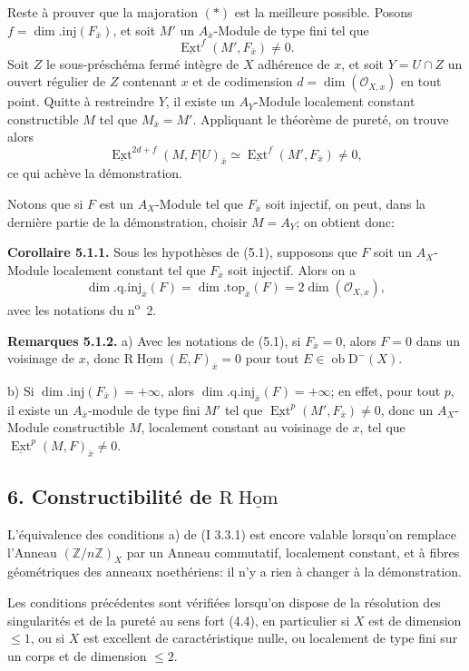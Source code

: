 \documentclass[11pt]{article}
\DeclareMathOperator{\Hom}{Hom}
\DeclareMathOperator{\Ext}{Ext}
\newcommand{\R}{\mathrm{R}}\newcommand{\RHomCore}{\mathrm{RHom}}
\newcommand{\D}{\mathrm{D}}
\newcommand{\Z}{\mathbb{Z}}
\newcommand{\ob}{\operatorname{ob}}
\providecommand{\Hom}{\operatorname{Hom}}
\providecommand{\ob}{\operatorname{ob}}
\providecommand{\R}{\mathrm R}
\providecommand{\Z}{\mathbb Z}
\providecommand{\Hom}{\operatorname{Hom}}
\begin{document}
Reste à prouver que la majoration $(*)$ est la meilleure possible. Posons $f=\dim.\mathrm{inj}(F_{\bar{x}})$, et soit $M'$ un $A_{\bar{x}}$-Module de type fini tel que
\[
        \underline{\Ext}^f(M',F_{\bar{x}})\neq0.
\]
Soit $Z$ le sous-préschéma fermé intègre de $X$ adhérence de $x$, et soit $Y=U\cap Z$ un ouvert régulier de $Z$ contenant $x$ et de codimension $d=\dim(\mathcal{O}_{X,x})$ en tout point. Quitte à restreindre $Y$, il existe un $A_Y$-Module localement constant constructible $M$ tel que $M_{\bar{x}}=M'$. Appliquant le théorème de pureté, on trouve alors
\[
        \underline{\Ext}^{2d+f}(M,F|U)_{\bar{x}}\simeq \underline{\Ext}^f(M',F_{\bar{x}})\neq0,
\]
ce qui achève la démonstration.

Notons que si $F$ est un $A_X$-Module tel que $F_{\bar{x}}$ soit injectif, on peut, dans la dernière partie de la démonstration, choisir $M=A_Y$; on obtient donc:

\textbf{Corollaire 5.1.1.} Sous les hypothèses de (5.1), supposons que $F$ soit un $A_X$-Module localement constant tel que $F_{\bar{x}}$ soit injectif. Alors on a
\[
        \dim.\mathrm{q.inj}_{\bar{x}}(F)=\dim.\mathrm{top}_{\bar{x}}(F)=2\dim(\mathcal{O}_{X,x}),
\]
avec les notations du n\textsuperscript{o}~2.

\textbf{Remarques 5.1.2.} a) Avec les notations de (5.1), si $F_{\bar{x}}=0$, alors $F=0$ dans un voisinage de $x$, donc $\R\underline{\Hom}(E,F)_{\bar{x}}=0$ pour tout $E\in\ob\D^{-}(X)$.

b) Si $\dim.\mathrm{inj}(F_{\bar{x}})=+\infty$, alors $\dim.\mathrm{q.inj}_{\bar{x}}(F)=+\infty$; en effet, pour tout $p$, il existe un $A_{\bar{x}}$-module de type fini $M'$ tel que $\underline{\Ext}^p(M',F_{\bar{x}})\neq0$, donc un $A_X$-Module constructible $M$, localement constant au voisinage de $x$, tel que $\underline{\Ext}^p(M,F)_{\bar{x}}\neq0$.

\subsection*{6. Constructibilité de $\R\underline{\Hom}$}

L'équivalence des conditions a) de (I 3.3.1) est encore valable lorsqu'on remplace l'Anneau $(\Z/n\Z)_X$ par un Anneau commutatif, localement constant, et à fibres géométriques des anneaux noethériens: il n'y a rien à changer à la démonstration.

Les conditions précédentes sont vérifiées lorsqu'on dispose de la résolution des singularités et de la pureté au sens fort (4.4), en particulier si $X$ est de dimension $\leq1$, ou si $X$ est excellent de caractéristique nulle, ou localement de type fini sur un corps et de dimension $\leq2$.
\end{document}
